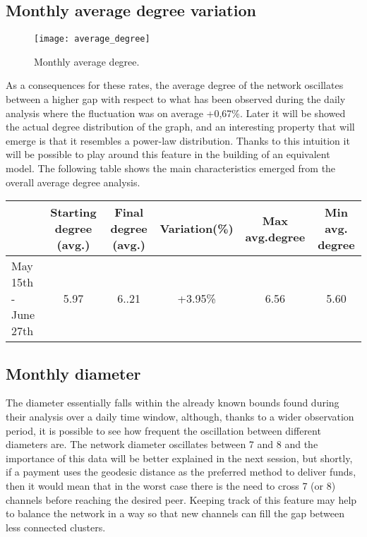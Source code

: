 	\subsection{Monthly average degree variation}
	
	\begin{figure}
		\centering
		\texttt{[image: average\_degree]}
		\caption{Monthly average degree.}
		\label{monthly_degree}
	\end{figure}
	
	As a consequences for these rates, the average degree of the network oscillates between a higher gap with respect to what has been observed during the daily analysis where the fluctuation was on average +0,67\%. Later it will be showed the actual degree distribution of the graph, and an interesting property that will emerge is that it resembles a power-law distribution. Thanks to this intuition it will be possible to play around this feature in the building of an equivalent model. The following table shows the main characteristics emerged from the overall average degree analysis.
	
	\begin{center}
		\begin{tabulary}{\linewidth}{| L | C | C | C | C | C |}
			\hline	
			& Starting degree (avg.) & Final degree (avg.)  & Variation(\%) & Max avg.degree & Min avg. degree \\ \hline
			May 15th - June 27th & 5.97 & 6..21 & +3.95\% & 6.56 & 5.60 \\ \hline
		\end{tabulary}
	\end{center}
	
	\subsection{Monthly diameter}
	
	The diameter essentially falls within the already known bounds found during their analysis over a daily time window, although, thanks to a wider observation period, it is possible to see how frequent the oscillation between different diameters are. The network diameter oscillates between 7 and 8 and the importance of this data will be better explained in the next session, but shortly, if a payment uses the geodesic distance as the preferred method to deliver funds, then it would mean that in the worst case there is the need to cross 7 (or 8) channels before reaching the desired peer. Keeping track of this feature may help to balance the network in a way so that new channels can fill the gap between less connected clusters.
	
